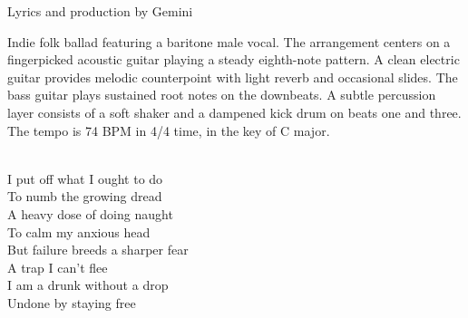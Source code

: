 
\label{sec:a-drunk-without-a-drop}

\begin{notes}
Lyrics and production by Gemini
\end{notes}

\begin{style}
Indie folk ballad featuring a baritone male vocal. %
The arrangement centers on a fingerpicked acoustic guitar playing a steady eighth-note pattern. %
A clean electric guitar provides melodic counterpoint with light reverb and occasional slides. %
The bass guitar plays sustained root notes on the downbeats. %
A subtle percussion layer consists of a soft shaker and a dampened kick drum on beats one and three. %
The tempo is 74 BPM in 4/4 time, in the key of C major.
\end{style}

\begin{lyrics}


\\
I put off what I ought to do\\
To numb the growing dread \\
A heavy dose of doing naught\\
To calm my anxious head\\
But failure breeds a sharper fear\\
A trap I can't flee \\
I am a drunk without a drop\\
Undone by staying free 

\end{lyrics}

